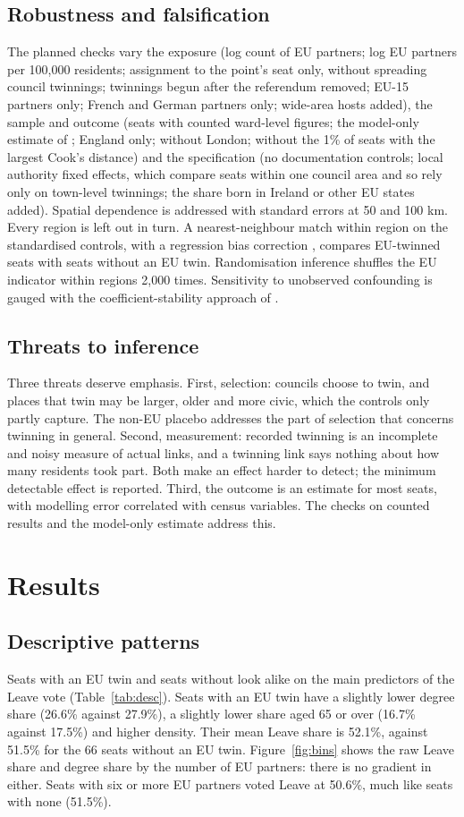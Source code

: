 \documentclass[11pt,a4paper]{article}
\begin{document}
\subsection{Robustness and falsification}
The planned checks vary the exposure (log count of EU partners; log EU partners per 100,000 residents; assignment to the point's seat only, without spreading council twinnings; twinnings begun after the referendum removed; EU-15 partners only; French and German partners only; wide-area hosts added), the sample and outcome (seats with counted ward-level figures; the model-only estimate of \citealt{hanretty2017}; England only; without London; without the 1\% of seats with the largest Cook's distance) and the specification (no documentation controls; local authority fixed effects, which compare seats within one council area and so rely only on town-level twinnings; the share born in Ireland or other EU states added). Spatial dependence is addressed with \citet{conley1999} standard errors at 50 and 100 km. Every region is left out in turn. A nearest-neighbour match within region on the standardised controls, with a regression bias correction \citep{abadie2006}, compares EU-twinned seats with seats without an EU twin. Randomisation inference shuffles the EU indicator within regions 2,000 times. Sensitivity to unobserved confounding is gauged with the coefficient-stability approach of \citet{oster2019}.

\subsection{Threats to inference}
Three threats deserve emphasis. First, selection: councils choose to twin, and places that twin may be larger, older and more civic, which the controls only partly capture. The non-EU placebo addresses the part of selection that concerns twinning in general. Second, measurement: recorded twinning is an incomplete and noisy measure of actual links, and a twinning link says nothing about how many residents took part. Both make an effect harder to detect; the minimum detectable effect is reported. Third, the outcome is an estimate for most seats, with modelling error correlated with census variables. The checks on counted results and the model-only estimate address this.

\section{Results}\label{sec:results}
\subsection{Descriptive patterns}
Seats with an EU twin and seats without look alike on the main predictors of the Leave vote (Table~\ref{tab:desc}). Seats with an EU twin have a slightly lower degree share (26.6\% against 27.9\%), a slightly lower share aged 65 or over (16.7\% against 17.5\%) and higher density. Their mean Leave share is 52.1\%, against 51.5\% for the 66 seats without an EU twin. Figure~\ref{fig:bins} shows the raw Leave share and degree share by the number of EU partners: there is no gradient in either. Seats with six or more EU partners voted Leave at 50.6\%, much like seats with none (51.5\%).
\end{document}
